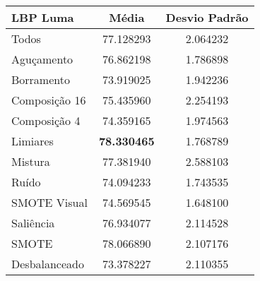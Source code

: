 %
\begin{table}[H]
\begin{center}
\caption{}
\label{tab:resultados:x:melhor}
\begin{tabular}{|l|c|c|}
\hline
\textbf{LBP Luma} & \textbf{Média}     & \textbf{Desvio Padrão} \\ \hline
   Todos        &  77.128293 &  2.064232  \\ \hline
  Aguçamento    &  76.862198 &  1.786898  \\ \hline
  Borramento    &  73.919025 &  1.942236  \\ \hline
  Composição 16 &  75.435960 &  2.254193  \\ \hline
  Composição 4  &  74.359165 &  1.974563  \\ \hline
  Limiares      &  \textbf{78.330465} &  1.768789  \\ \hline
  Mistura       &  77.381940 &  2.588103  \\ \hline
  Ruído         &  74.094233 &  1.743535  \\ \hline
  SMOTE Visual  &  74.569545 &  1.648100  \\ \hline
  Saliência     &  76.934077 &  2.114528  \\ \hline
 SMOTE          &  78.066890 &  2.107176  \\ \hline
Desbalanceado   &  73.378227 &  2.110355  \\ \hline
\end{tabular}
\end{center}
\end{table}



